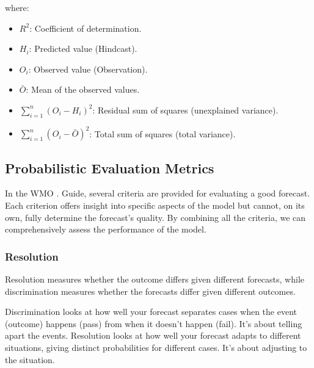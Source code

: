 where:

\begin{itemize}
	\item \( R^2 \): Coefficient of determination.
	\item \( H_i \): Predicted value (Hindcast).
	\item \( O_i \): Observed value (Observation).
	\item \( \bar{O} \): Mean of the observed values.
	\item \( \sum_{i=1}^n (O_i - H_i)^2 \): Residual sum of squares (unexplained variance).
	\item \( \sum_{i=1}^n (O_i - \bar{O})^2 \): Total sum of squares (total variance).
\end{itemize}





\subsection{Probabilistic Evaluation Metrics}


In the WMO\footnotemark{} . Guide, several criteria are provided for evaluating a good forecast. Each criterion offers insight into specific aspects of the model but cannot, on its own, fully determine the forecast's quality. By combining all the criteria, we can comprehensively assess the performance of the model.	 
		\subsubsection{Resolution}
	Resolution measures whether the outcome differs given different forecasts, while discrimination measures whether the forecasts differ given different outcomes.

Discrimination looks at how well your forecast separates cases when the event (outcome) happens (pass) from when it doesn’t happen (fail). It’s about telling apart the events.
Resolution looks at how well your forecast adapts to different situations, giving distinct probabilities for different cases. It’s about adjusting to the situation.


